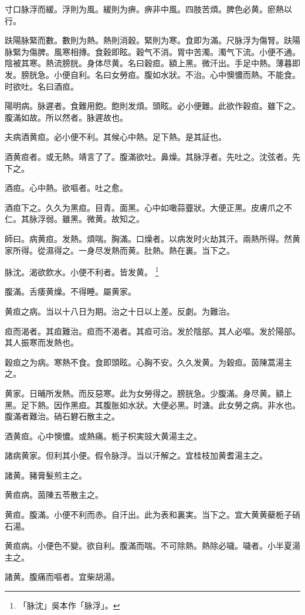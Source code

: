 寸口脉浮而緩。浮則为風。緩則为痹。痹非中風。四肢苦煩。脾色必黄。瘀熱以行。

趺陽脉緊而數。數則为熱。熱則消穀。緊則为寒。食即为滿。尺脉浮为傷腎。趺陽脉緊为傷脾。風寒相摶。食穀即眩。穀气不消。胃中苦濁。濁气下流。小便不通。陰被其寒。熱流膀胱。身体尽黄。名曰穀疸。額上黑。微汗出。手足中熱。薄暮即发。膀胱急。小便自利。名曰女勞疸。腹如水狀。不治。心中懊憹而熱。不能食。时欲吐。名曰酒疸。

陽明病。脉遲者。食難用飽。飽則发煩。頭眩。必小便難。此欲作穀疸。雖下之。腹滿如故。所以然者。脉遲故也。

夫病酒黄疸。必小便不利。其候心中熱。足下熱。是其証也。

酒黄疸者。或无熱。靖言了{\khaaitp 了}。腹滿欲吐。鼻燥。其脉浮者。先吐之。沈弦者。先下之。

酒疸。心中熱。欲嘔者。吐之愈。

酒疸下之。久久为黑疸。目青。面黑。心中如噉蒜虀狀。大便正黑。皮膚爪之不仁。其脉浮弱。雖黑。微黄。故知之。

師曰。病黄疸。发熱。煩喘。胸滿。口燥者。以病发时火劫其汗。兩熱所得。然黄家所得。從濕得之。一身尽发熱而黄。肚熱。熱在裏。当下之。

脉沈。渴欲飲水。小便不利者。皆发黄。
	\footnote{「脉沈」吳本作「脉浮」。}

腹滿。舌痿黄燥。不得睡。屬黄家。

黄疸之病。当以十八日为期。治之十日以上差。反劇。为難治。

疸而渴者。其疸難治。疸而不渴者。其疸可治。发於陰部。其人必嘔。{\khaaitp 发於}陽部。其人振寒而发熱也。

穀疸之为病。寒熱不食。食即頭眩。心胸不安。久久发黄。为穀疸。茵陳蒿湯主之。

黄家。日晡所发熱。而反惡寒。此为女勞得之。膀胱急。少腹滿。身尽黄。額上黑。足下熱。因作黑疸。其腹胀如水狀。大便必黑。时溏。此女勞之病。非水也。腹滿者難治。硝石礬石散主之。

酒黄疸。心中懊憹。或熱痛。栀子{\khaaitp 枳実豉}大黄湯主之。

諸病黄家。但利其小便。假令脉浮。当以汗解之。宜桂枝加黄耆湯主之。

諸黄。豬膏髮煎主之。

黄疸病。茵陳五苓散主之。

黄疸。腹滿。小便不利而赤。自汗出。此为表和裏実。当下之。宜大黄{\khaaitp 黄蘗栀子}硝石湯。

黄疸病。小便色不變。欲自利。腹滿而喘。不可除熱。熱除必噦。噦者。小半夏湯主之。

諸黄。腹痛而嘔者。宜柴胡湯。

